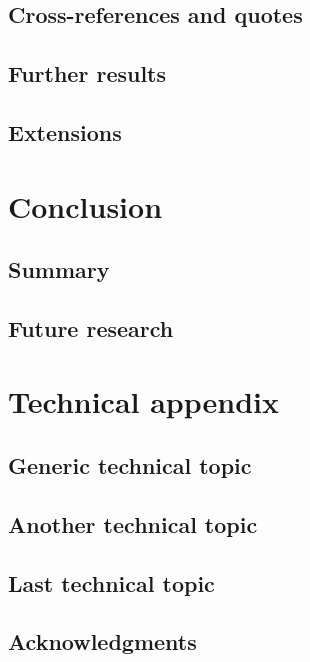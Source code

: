 \documentclass[letterpaper,11pt,leqno]{book}
\newcommand{\bib}{book.bib}
\begin{document}


\chapter{Cross-references and quotes}\label{c:conclusion}



\chapter{Further results}\label{c:further}



\chapter{Extensions}\label{c:extensions}



\part{Conclusion}\label{p:conclusion}

\chapter{Summary}\label{c:summary}



\chapter{Future research}\label{c:future}



\appendix

\part{Technical appendix}\label{p:appendix}

\chapter{Generic technical topic}\label{a:appendix1}



\chapter{Another technical topic}\label{a:appendix2}



\chapter{Last technical topic}\label{a:appendix3}



\backmatter



\chapter{Acknowledgments}



\printindex
\end{document}
